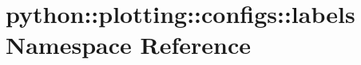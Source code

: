 \hypertarget{namespacepython_1_1plotting_1_1configs_1_1labels}{
\section{python::plotting::configs::labels Namespace Reference}
\label{namespacepython_1_1plotting_1_1configs_1_1labels}
}
